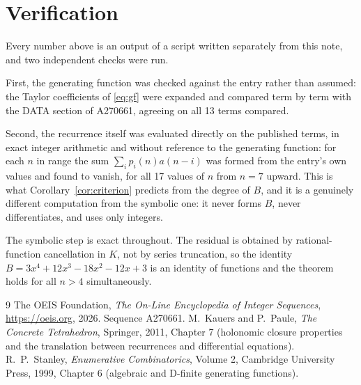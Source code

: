 \documentclass[11pt,a4paper]{article}
\theoremstyle{plain}
\theoremstyle{definition}
\begin{document}
\section{Verification}

Every number above is an output of a script written separately from this note, and two
independent checks were run.

First, the generating function was checked against the entry rather than assumed: the
Taylor coefficients of \eqref{eq:gf} were expanded and compared term by term with the DATA
section of A270661, agreeing on all 13 terms compared.

Second, the recurrence itself was evaluated directly on the published terms, in exact
integer arithmetic and without reference to the generating function: for each $n$ in range
the sum $\sum_{i}p_{i}(n)a(n-i)$ was formed from the entry's own values and found to
vanish, for all 17 values of $n$ from $n=7$ upward. This is what
Corollary~\ref{cor:criterion} predicts from the degree of $B$, and it is a genuinely
different computation from the symbolic one: it never forms $B$, never differentiates, and
uses only integers.

The symbolic step is exact throughout. The residual is obtained by rational-function
cancellation in $K$, not by series truncation, so the identity $B=3 x^{4} + 12 x^{3} - 18 x^{2} - 12 x + 3$ is an
identity of functions and the theorem holds for all $n>4$ simultaneously.

\begin{thebibliography}{9}
 The OEIS Foundation, \emph{The On-Line Encyclopedia of Integer Sequences},
\url{https://oeis.org}, 2026. Sequence A270661.
 M.~Kauers and P.~Paule, \emph{The Concrete Tetrahedron}, Springer, 2011,
Chapter 7 (holonomic closure properties and the translation between recurrences and
differential equations).
 R.~P.~Stanley, \emph{Enumerative Combinatorics}, Volume 2, Cambridge
University Press, 1999, Chapter 6 (algebraic and D-finite generating functions).
\end{thebibliography}
\end{document}

